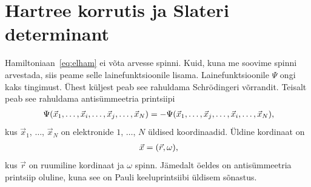 \documentclass[12pt]{report}
\begin{document}
\section{Hartree korrutis ja Slateri determinant}\label{sec:hpsd}

Hamiltoniaan~\eqref{eq:elham} ei võta arvesse spinni.
Kuid, kuna me soovime spinni arvestada, siis peame selle lainefunktsioonile lisama.
Lainefunktsioonile \(\Psi\) ongi kaks tingimust.
Ühest küljest peab see rahuldama Schrödingeri võrrandit.
Teisalt peab see rahuldama antisümmeetria printsiipi
\begin{align}\label{eq:antisim}
    \Psi(\vec{x}_1, \ldots, \vec{x}_i, \ldots, \vec{x}_j, \ldots, \vec{x}_N) =
    -\Psi(\vec{x}_1, \ldots, \vec{x}_j, \ldots, \vec{x}_i, \ldots, \vec{x}_N) \rlap{,}
\end{align}
kus \(\vec{x}_1\), \(\ldots\), \(\vec{x}_N\) on elektronide \(1\), \(\ldots\), \(N\) üldised koordinaadid.
Üldine kordinaat on
\begin{align}
    \vec{x} = (\vec{r}, \omega) \rlap{,}
\end{align}
kus \(\vec{r}\) on ruumiline kordinaat ja \(\omega\) spinn.
Jämedalt öeldes on antisümmeetria printsiip oluline, kuna see on Pauli keeluprintsiibi üldisem sõnastus.
\end{document}
